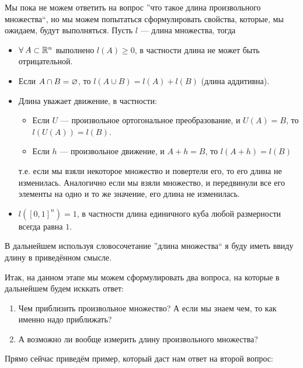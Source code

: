 Мы пока не можем ответить на вопрос ''что такое длина произвольного множества``, но мы можем попытаться сформулировать
свойства, которые, мы ожидаем, будут выполняться. Пусть $l$ --- длина множества, тогда
\begin{itemize}
    \item $\forall\: A \subset \mathbb{R}^n$ выполнено $l(A) \geq 0$, в частности длина не может быть отрицательной.
    \item Если $A \cap B = \varnothing$, то $l(A \cup B) = l(A) + l(B)$ (длина аддитивна).
    \item Длина уважает движение, в частности:
    \begin{itemize}
        \item[\circ] Если $U$ --- произвольное ортогональное преобразование, и $U(A) = B$, то $l(U(A)) = l(B)$.
        \item[\circ] Если $h$ --- произвольное движение, и $A + h = B$, то $l(A + h) = l(B)$
    \end{itemize}
    т.е. если мы взяли некоторое множество и повертели его, то его длина не изменилась. Аналогично если
    мы взяли множество, и передвинули все его элементы на одно и то же значение, его длина не изменилась.
    \item $l([0, 1]^n) = 1$, в частности длина единичного куба любой размерности всегда равна $1$.
\end{itemize}
В дальнейшем используя словосочетание ''длина множества`` я буду иметь ввиду длину в приведённом смысле.

Итак, на данном этапе мы можем сформулировать два вопроса, на которые в дальнейшем будем исккать ответ:
\begin{enumerate}
    \item Чем приблизить произвольное множество? А если мы знаем чем, то как именно надо приближать?
    \item А возможно ли вообще измерить длину произвольного множества?
\end{enumerate}
Прямо сейчас приведём пример, который даст нам ответ на второй вопрос:

